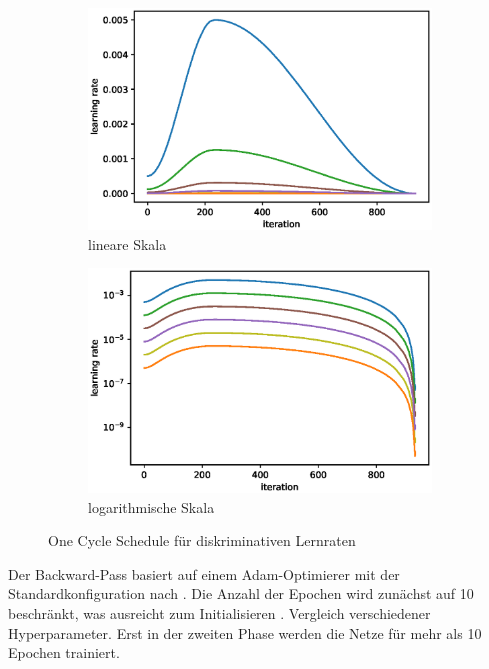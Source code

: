 \begin{figure}
    \centering
    \begin{subfigure}{.5\textwidth}
        \centering
        \includegraphics[width=.9\linewidth]{img/06_one_cycle_lin.eps}
        \caption{lineare Skala}
    \end{subfigure}%
    \begin{subfigure}{.5\textwidth}
        \centering
        \includegraphics[width=.9\linewidth]{img/06_one_cycle_log.eps}
        \caption{logarithmische Skala}
    \end{subfigure}
    \caption{One Cycle Schedule für diskriminativen Lernraten}
    \label{fig:one-cylce}
\end{figure}

Der Backward-Pass basiert auf einem Adam-Optimierer \cite{Kingma14} mit der Standardkonfiguration nach \cite{Gugger20}.
Die Anzahl der Epochen wird zunächst auf 10 beschränkt, was ausreicht zum Initialisieren \bzw. Vergleich verschiedener Hyperparameter.
Erst in der zweiten Phase werden die Netze für mehr als 10 Epochen trainiert.

